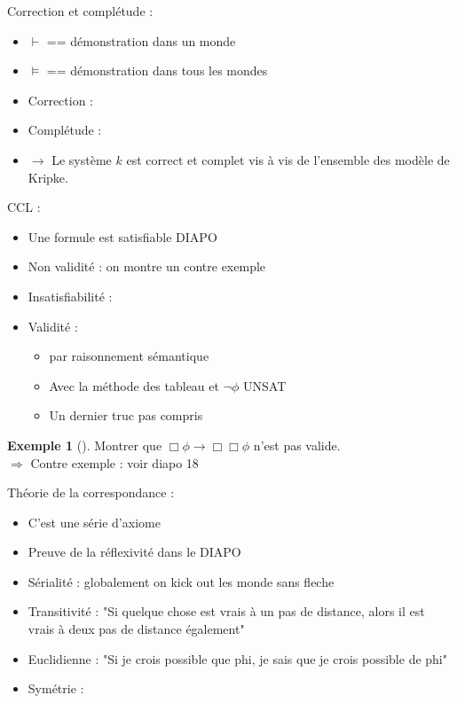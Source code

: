 \documentclass{article}
\theoremstyle{plain}%
\theoremstyle{definition}
\newtheorem{exmp}{Exemple}[section]
\theoremstyle{remark}
\begin{document}
Correction et complétude : 
\begin{itemize}
    \item $ \vdash  $ == démonstration dans un monde
    \item $ \models  $ == démonstration dans tous les mondes
    \item Correction : 
    \item Complétude :
    \item $\rightarrow$ Le système $ k $ est correct et complet vis à vis de l'ensemble des modèle de Kripke. 
\end{itemize}

CCL : 
\begin{itemize}
    \item Une formule est satisfiable DIAPO
    \item Non validité : on montre un contre exemple
    \item Insatisfiabilité : 
    \item Validité : \begin{itemize}
        \item par raisonnement sémantique
        \item Avec la méthode des tableau et $ \lnot \phi  $ UNSAT
        \item Un dernier truc pas compris
    \end{itemize}
\end{itemize}

\begin{exmp}[]
    Montrer que $ \Box \phi \rightarrow \Box \Box \phi  $ n'est pas valide. \\
    $\Rightarrow$ Contre exemple : voir diapo 18
\end{exmp}

Théorie de la correspondance : 
\begin{itemize}
    \item C'est une série d'axiome 
    \item Preuve de la réflexivité dans le DIAPO
    \item Sérialité : globalement on kick out les monde sans fleche 
    \item Transitivité : "Si quelque chose est vrais à un pas de distance, alors il est vrais à deux pas de distance également"
    \item Euclidienne : "Si je crois possible que phi, je sais que je crois possible de phi"
    \item Symétrie : 
\end{itemize}
\end{document}
